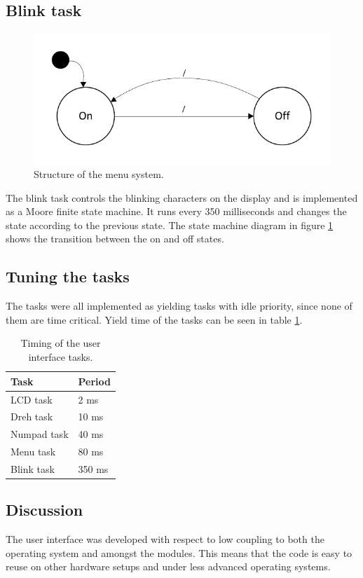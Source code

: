 \subsection{Blink task}
\begin{figure}[htb]
	\centering
	\includegraphics[scale=0.9,trim=0 0 0 0]{graphics/blink_task_fsm.pdf} 
	\caption{Structure of the menu system.}
	\label{fig:blink_task_fsm}
\end{figure}
The blink task controls the blinking characters on the display and is implemented as a Moore finite state machine. It runs every 350 milliseconds and changes the state according to the previous state. The state machine diagram in figure \ref{fig:blink_task_fsm} shows the transition between the on and off states.

\subsection{Tuning the tasks}
The tasks were all implemented as yielding tasks with idle priority, since none of them are time critical. Yield time of the tasks can be seen in table \ref{tab:ui_task_timing}.

\begin{table}[htb]	
	\centering
	\begin{tabular}{ll}					
	Task & Period \\					
	\midrule							
LCD task & 2 ms \\
Dreh task  & 10 ms \\
Numpad task & 40 ms \\
Menu task & 80 ms \\
Blink task & 350 ms \\
	\end{tabular}
	\caption{Timing of the user interface tasks.}	
	\label{tab:ui_task_timing}				
\end{table}

\subsection{Discussion}
The user interface was developed with respect to low coupling to both the operating system and amongst the modules. This means that the code is easy to reuse on other hardware setups and under less advanced operating systems. 

